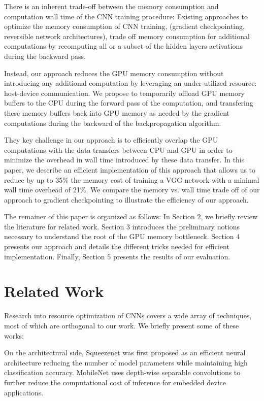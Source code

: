 \documentclass[11pt,onecolumn]{article}
\begin{document}
There is an inherent trade-off between the memory consumption and computation wall time
of the CNN training procedure:
Existing approaches to optimize the memory consumption of CNN training,
(gradient checkpointing, reversible network architectures),
trade off memory consumption for additional computations by 
recomputing all or a subset of the hidden layers activations during the backward pass.

Instead, our approach reduces the GPU memory consumption without introducing any additional
computation by leveraging an under-utilized resource: host-device communication.
We propose to temporarily offload GPU memory buffers to the CPU during the forward pass 
of the computation, and transfering these memory buffers back into GPU memory as needed by the gradient computations during the backward of the backpropagation algorithm.

They key challenge in our approach is to efficiently overlap the GPU computations
with the data transfers between CPU and GPU in order to minimize the overhead in wall time
introduced by these data transfer.
In this paper, we describe an efficient implementation of this approach that allows us to reduce by
up to 35\% the memory cost of training a VGG network with a minimal wall time overhead of 21\%.
We compare the memory vs. wall time trade off of our approach to gradient checkpointing 
to illustrate the efficiency of our approach.

The remainer of this paper is organized as follows: In Section 2, we briefly review the literature for related work.
Section 3 introduces the preliminary notions necessary to understand the root of the GPU memory bottleneck.
Section 4 presents our approach and details the different tricks needed for efficient implementation. 
Finally, Section 5 presents the results of our evaluation.

\section{Related Work}

Research into resource optimization of CNNs covers a wide array of techniques, 
most of which are orthogonal to our work. 
We briefly present some of these works:

On the architectural side, Squeezenet \cite{iandola2016squeezenet} 
was first proposed as an efficient neural architecture 
reducing the number of model parameters while maintaining high classification accuracy.
MobileNet \cite{howard2017mobilenets} uses depth-wise separable 
convolutions to further reduce the computational cost of inference for embedded device applications.
\end{document}
